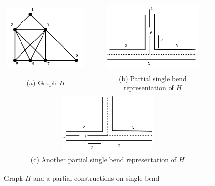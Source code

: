 \begin{figure}[htb]	
 
   \centering
  \begin{tabular}{  c p{0.7cm} c}
    \includegraphics[width=5cm]{img/grafoH.png} & &
    \includegraphics[width=5cm]{img/noClawVertical.png}
    \\
    \footnotesize %
    (a)  \footnotesize Graph $H$ && \footnotesize (b) Partial single bend representation of $H$\\
    \multicolumn{3}{c}{\includegraphics[width=5cm]{img/noClawHorizontal.png}  }
    \\
    \multicolumn{3}{c}{ \footnotesize (c) Another partial single bend representation of $H$ }
    \\
  \end{tabular}
 \caption{Graph $H$ and a partial constructions on single bend}
 \label{fig:noClawVertical}
\end{figure}  
 
